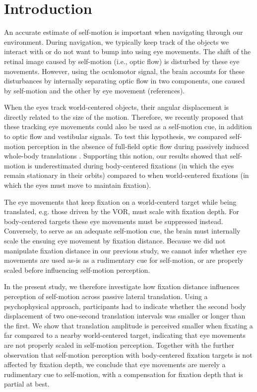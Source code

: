 \section{Introduction}

An accurate estimate of self-motion is important when navigating through our environment. During navigation, we typically keep track of the objects we interact with or do not want to bump into using eye movements. The shift of the retinal image caused by self-motion (i.e., optic flow) is disturbed by these eye movements. However, using the oculomotor signal, the brain accounts for these disturbances by internally separating optic flow in two components, one caused by self-motion and the other by eye movement (references).

When the eyes track world-centered objects, their angular displacement is directly related to the size of the motion. Therefore, we recently proposed that these tracking eye movements could also be used as a self-motion cue, in addition to optic flow and vestibular signals. To test this hypothesis, we compared self-motion perception in the absence of full-field optic flow during passively induced whole-body translations \cite{clemens2015a}. Supporting this notion, our results showed that self-motion is underestimated during body-centered fixations (in which the eyes remain stationary in their orbits) compared to when world-centered fixations (in which the eyes must move to maintain fixation).

The eye movements that keep fixation on a world-centerd target while being translated, e.g. those driven by the VOR, must scale with fixation depth. For body-centered targets these eye movements must be suppressed instead. Conversely, to serve as an adequate self-motion cue, the brain must internally scale the ensuing eye movement by fixation distance. Because we did not manipulate fixation distance in our previous study, we cannot infer whether eye movements are used as-is as a rudimentary cue for self-motion, or are properly scaled before influencing self-motion perception.

In the present study, we therefore investigate how fixation distance influences perception of self-motion across passive lateral translation. Using a psychophysical approach, participants had to indicate whether the second body displacement of two one-second translation intervals was smaller or longer than the first. We show that translation amplitude is perceived smaller when fixating a far compared to a nearby world-centered target, indicating that eye movements are not properly scaled in self-motion perception. Together with the further observation that self-motion perception with body-centered fixation targets is not affected by fixation depth, we conclude that eye movements are merely a rudimentary cue to self-motion, with a compensation for fixation depth that is partial at best.

